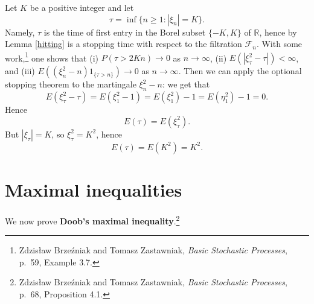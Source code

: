 \documentclass{article}
\theoremstyle{definition}
\begin{document}
Let $K$ be a positive integer and let
\[
\tau = \inf\{n \geq 1: |\xi_n|=K\}.
\]
Namely, $\tau$ is the time of first entry in the Borel subset $\{-K,K\}$ of $\mathbb{R}$, hence by Lemma \ref{hitting} is a stopping time
with respect to the filtration $\mathscr{F}_n$. With some work,\footnote{Zdzis\l{}aw Brze\'zniak and Tomasz Zastawniak, {\em Basic Stochastic Processes},
p.~59, Example 3.7.}
one shows that
(i) $P(\tau>2Kn) \to 0$ as $n \to \infty$,
(ii) $E(|\xi_\tau^2-\tau|)<\infty$,
and (iii) $E((\xi_n^2-n)1_{\{\tau>n\}}) \to 0$ as $n \to \infty$. 
Then we can apply the optional stopping theorem to the martingale $\xi_n^2-n$: we get that
\[
E(\xi_\tau^2-\tau) = E(\xi_1^2-1) = E(\xi_1^2) - 1 = E(\eta_1^2) - 1 = 0.
\]
Hence
\[
E(\tau) = E(\xi_\tau^2).
\]
But $|\xi_\tau|=K$, so $\xi_\tau^2=K^2$, hence
\[
E(\tau) = E(K^2) = K^2.
\]



\section{Maximal inequalities}
We now prove \textbf{Doob's maximal inequality}.\footnote{Zdzis\l{}aw Brze\'zniak and Tomasz Zastawniak, {\em Basic Stochastic Processes},
p.~68, Proposition 4.1.}
\end{document}
